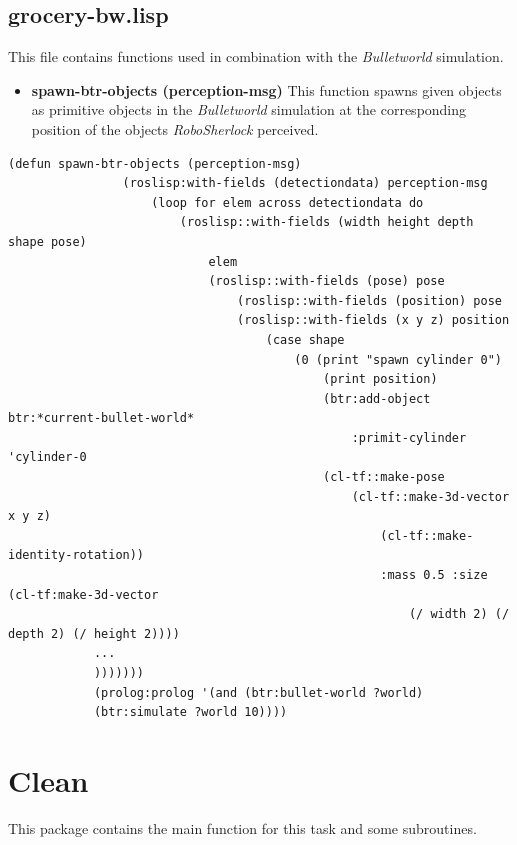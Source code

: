 \documentclass[main.tex]{subfiles}
\begin{document}
		\subsection{grocery-bw.lisp}
		This file contains functions used in combination with the \textit{Bulletworld} simulation.
		\begin{itemize}
			\item \textbf{spawn-btr-objects (perception-msg)}
			This function spawns given objects as primitive objects in the \textit{Bulletworld} simulation at the corresponding position of the objects \textit{RoboSherlock} perceived.  
		\end{itemize}
		\begin{lstlisting}[language={elisp}]
			(defun spawn-btr-objects (perception-msg)
				(roslisp:with-fields (detectiondata) perception-msg
					(loop for elem across detectiondata do
						(roslisp::with-fields (width height depth shape pose) 
							elem
							(roslisp::with-fields (pose) pose
								(roslisp::with-fields (position) pose
								(roslisp::with-fields (x y z) position 
									(case shape
										(0 (print "spawn cylinder 0")
											(print position)
											(btr:add-object btr:*current-bullet-world* 
												:primit-cylinder 'cylinder-0 
											(cl-tf::make-pose 
												(cl-tf::make-3d-vector x y z)
													(cl-tf::make-identity-rotation))
													:mass 0.5 :size (cl-tf:make-3d-vector 
														(/ width 2) (/ depth 2) (/ height 2))))
			...
			)))))))
			(prolog:prolog '(and (btr:bullet-world ?world)
			(btr:simulate ?world 10))))
		\end{lstlisting}
	  	\section{Clean}
	  	\label{clean}
	  	This package contains the main function for this task and some subroutines.
\end{document}
